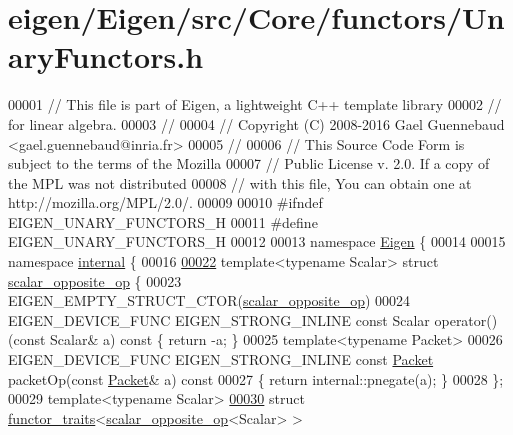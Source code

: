 \hypertarget{eigen_2_eigen_2src_2_core_2functors_2_unary_functors_8h_source}{}\section{eigen/\+Eigen/src/\+Core/functors/\+Unary\+Functors.h}
\label{eigen_2_eigen_2src_2_core_2functors_2_unary_functors_8h_source}

\begin{DoxyCode}
00001 \textcolor{comment}{// This file is part of Eigen, a lightweight C++ template library}
00002 \textcolor{comment}{// for linear algebra.}
00003 \textcolor{comment}{//}
00004 \textcolor{comment}{// Copyright (C) 2008-2016 Gael Guennebaud <gael.guennebaud@inria.fr>}
00005 \textcolor{comment}{//}
00006 \textcolor{comment}{// This Source Code Form is subject to the terms of the Mozilla}
00007 \textcolor{comment}{// Public License v. 2.0. If a copy of the MPL was not distributed}
00008 \textcolor{comment}{// with this file, You can obtain one at http://mozilla.org/MPL/2.0/.}
00009 
00010 \textcolor{preprocessor}{#ifndef EIGEN\_UNARY\_FUNCTORS\_H}
00011 \textcolor{preprocessor}{#define EIGEN\_UNARY\_FUNCTORS\_H}
00012 
00013 \textcolor{keyword}{namespace }\hyperlink{namespace_eigen}{Eigen} \{
00014 
00015 \textcolor{keyword}{namespace }\hyperlink{namespaceinternal}{internal} \{
00016 
\hyperlink{struct_eigen_1_1internal_1_1scalar__opposite__op}{00022} \textcolor{keyword}{template}<\textcolor{keyword}{typename} Scalar> \textcolor{keyword}{struct }\hyperlink{struct_eigen_1_1internal_1_1scalar__opposite__op}{scalar\_opposite\_op} \{
00023   EIGEN\_EMPTY\_STRUCT\_CTOR(\hyperlink{struct_eigen_1_1internal_1_1scalar__opposite__op}{scalar\_opposite\_op})
00024   EIGEN\_DEVICE\_FUNC EIGEN\_STRONG\_INLINE \textcolor{keyword}{const} Scalar operator() (\textcolor{keyword}{const} Scalar& a)\textcolor{keyword}{ const }\{ \textcolor{keywordflow}{return} -a; \}
00025   \textcolor{keyword}{template}<\textcolor{keyword}{typename} Packet>
00026   EIGEN\_DEVICE\_FUNC EIGEN\_STRONG\_INLINE \textcolor{keyword}{const} \hyperlink{union_eigen_1_1internal_1_1_packet}{Packet} packetOp(\textcolor{keyword}{const} \hyperlink{union_eigen_1_1internal_1_1_packet}{Packet}& a)\textcolor{keyword}{ const}
00027 \textcolor{keyword}{  }\{ \textcolor{keywordflow}{return} internal::pnegate(a); \}
00028 \};
00029 \textcolor{keyword}{template}<\textcolor{keyword}{typename} Scalar>
\hyperlink{struct_eigen_1_1internal_1_1functor__traits_3_01scalar__opposite__op_3_01_scalar_01_4_01_4}{00030} \textcolor{keyword}{struct }\hyperlink{struct_eigen_1_1internal_1_1functor__traits}{functor\_traits}<\hyperlink{struct_eigen_1_1internal_1_1scalar__opposite__op}{scalar\_opposite\_op}<Scalar> >

\end{DoxyCode}

